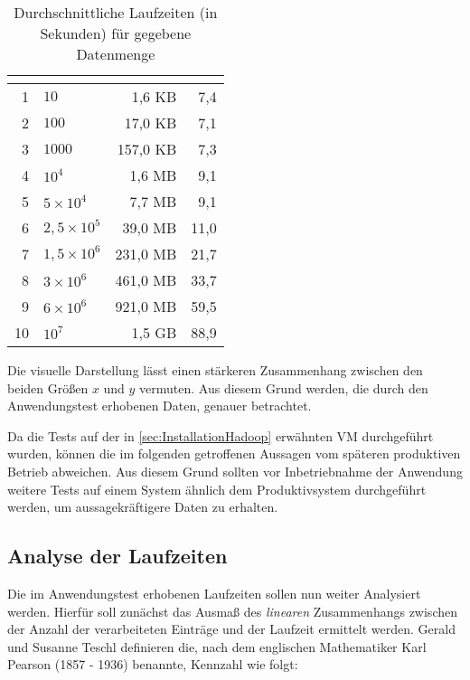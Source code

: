 \begin{table}
	\centering
	\begin{tabular}{| r | l | r | r |}
		\hline
		\rowcolor[HTML]{3531FF} 
		\multicolumn{1}{|l|}{\cellcolor[HTML]{4F88BB}{\color[HTML]{FFFFFF} {\bf \#}}} & \multicolumn{1}{l|}{\cellcolor[HTML]{4F88BB}{\color[HTML]{FFFFFF} {\bf Anzahl Einträge}}} & \multicolumn{1}{l|}{\cellcolor[HTML]{4F88BB}{\color[HTML]{FFFFFF} {\bf Dateigröße}}} & \multicolumn{1}{l|}{\cellcolor[HTML]{4F88BB}{\color[HTML]{FFFFFF} {\bf Laufzeit}}} \\ \hline
		1 & $10$ & 1,6 \ac{KB} & 7,4 \\  \hline
		2 & $100$ & 17,0 \ac{KB} & 7,1 \\ \hline
		3 & $1000$ & 157,0 \ac{KB} & 7,3 \\  \hline \hline
		4 & $10^4$ & 1,6 \ac{MB} & 9,1 \\  \hline
		5 & $5\times10^4$ & 7,7 \ac{MB} & 9,1 \\  \hline
		6 & $2,5\times10^5$ & 39,0 \ac{MB} & 11,0 \\  \hline
		7 & $1,5\times10^6$ & 231,0 \ac{MB} & 21,7 \\  \hline
		8 & $3\times10^6$ & 461,0 \ac{MB} & 33,7 \\  \hline
		9 & $6\times10^6$ & 921,0 \ac{MB} & 59,5 \\  \hline \hline
		10 & $10^7$ & 1,5 \ac{GB} & 88,9 \\  \hline
	\end{tabular}
	\caption{Durchschnittliche Laufzeiten (in Sekunden) für gegebene Datenmenge}
	\label{tbl:DurchschnittlicheLaufzeiten}
\end{table}

Die visuelle Darstellung lässt einen stärkeren Zusammenhang zwischen den beiden Größen $x$ und $y$ vermuten. Aus diesem Grund werden, die durch den Anwendungstest erhobenen Daten, genauer betrachtet.

Da die Tests auf der in \autoref{sec:InstallationHadoop} erwähnten \ac{VM} durchgeführt wurden, können die im folgenden getroffenen Aussagen vom späteren produktiven Betrieb abweichen. Aus diesem Grund sollten vor Inbetriebnahme der Anwendung weitere Tests auf einem System ähnlich dem Produktivsystem durchgeführt werden, um aussagekräftigere Daten zu erhalten.

\subsection{Analyse der Laufzeiten}\label{subsec:Laufzeitanalyse}
Die im Anwendungstest erhobenen Laufzeiten sollen nun weiter Analysiert werden. Hierfür soll zunächst das Ausmaß des \textit{linearen} Zusammenhangs zwischen der Anzahl der verarbeiteten Einträge und der Laufzeit ermittelt werden. Gerald und Susanne Teschl definieren die, nach dem englischen Mathematiker Karl Pearson (1857 - 1936) benannte, Kennzahl wie folgt:

